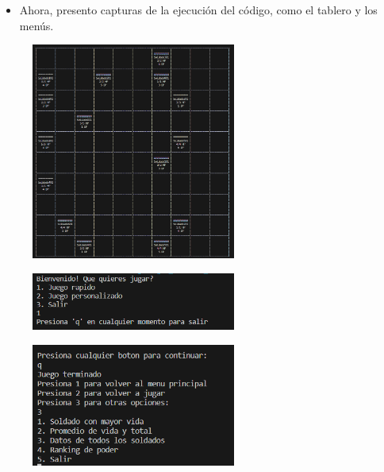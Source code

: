\documentclass{article}
\begin{document}
	\begin{itemize}
		\item Ahora, presento capturas de la ejecución del código, como el tablero y los menús.
	\end{itemize}
	\begin{figure}[H]
		\centering
	\includegraphics[width=0.6\textwidth,keepaspectratio]{img/tablero.png}
	\end{figure}
	\begin{figure}[H]
		\centering
	\includegraphics[width=0.6\textwidth,keepaspectratio]{img/menu1.png}
	\end{figure}
	\begin{figure}[H]
		\centering
	\includegraphics[width=0.6\textwidth,keepaspectratio]{img/menu2.png}
	\end{figure}
\end{document}
